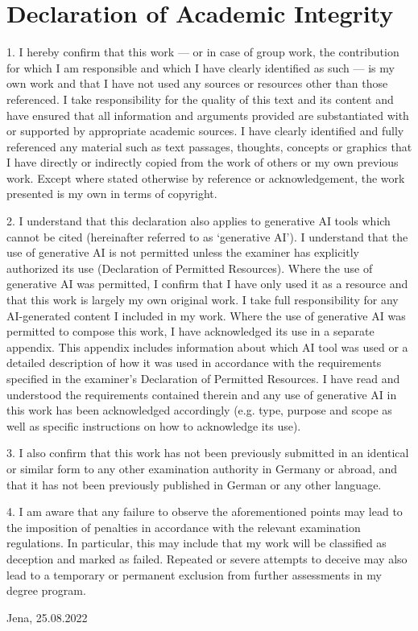 \documentclass[12pt, a4paper]{report}
\begin{document}
\chapter*{Declaration of Academic Integrity}
\footnotesize
1. I hereby confirm that this work — or in case of group work, the contribution for which I am
responsible and which I have clearly identified as such — is my own work and that I have not used
any sources or resources other than those referenced. 
I take responsibility for the quality of this text and its content and have ensured that all information and arguments provided are substantiated with or supported by appropriate academic sources. 
I have clearly identified and fully referenced any material such as text passages, thoughts, concepts or graphics that I have directly or indirectly copied from the work of others or my own previous work. 
Except where stated otherwise by reference or acknowledgement, the work presented is my own in terms of copyright.

2. I understand that this declaration also applies to generative AI tools which cannot be cited
(hereinafter referred to as ‘generative AI’).
I understand that the use of generative AI is not permitted unless the examiner has explicitly
authorized its use (Declaration of Permitted Resources).
Where the use of generative AI was permitted, I confirm that I have only used it as a resource and that this work is largely my own original work.
I take full responsibility for any AI-generated content I included in my work.
Where the use of generative AI was permitted to compose this work, I have acknowledged its use
in a separate appendix.
This appendix includes information about which AI tool was used or a detailed description of how it was used in accordance with the requirements specified in the examiner’s Declaration of Permitted Resources.
I have read and understood the requirements contained therein and any use of generative AI in this
work has been acknowledged accordingly (e.g. type, purpose and scope as well as specific
instructions on how to acknowledge its use).

3. I also confirm that this work has not been previously submitted in an identical or similar form to
any other examination authority in Germany or abroad, and that it has not been previously
published in German or any other language.

4. I am aware that any failure to observe the aforementioned points may lead to the imposition of
penalties in accordance with the relevant examination regulations.
In particular, this may include that my work will be classified as deception and marked as failed. Repeated or severe attempts to deceive may also lead to a temporary or permanent exclusion from further assessments in my degree program.

\vspace{50pt}

Jena, 25.08.2022
\end{document}
